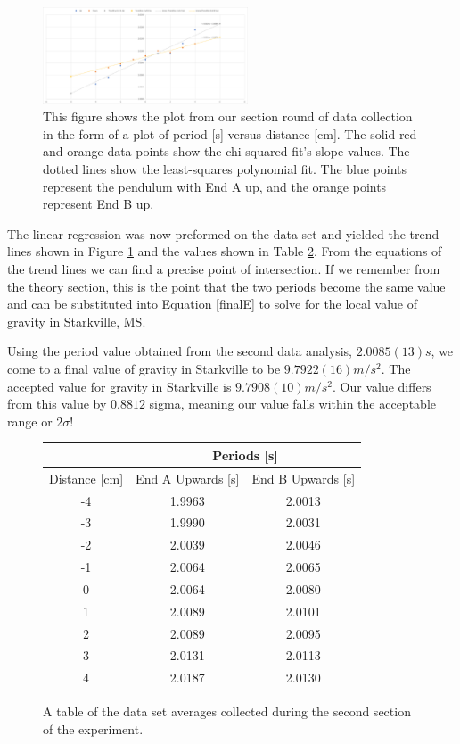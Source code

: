 \documentclass[aps,prl,10pt,twocolumn,floatfix]{revtex4-2}
\begin{document}
\begin{figure}
\includegraphics[width=230px]{SecondMeasurement.png}
\caption{This figure shows the plot from our section round of data collection in the form of a plot of period [s] versus distance [cm]. The solid red and orange data points show the chi-squared fit's slope values. The dotted lines show the least-squares polynomial fit. The blue points represent the pendulum with End A up, and the orange points represent End B up.}
\label{2stGraph}
\end{figure}

The linear regression was now preformed on the data set and yielded the trend lines shown in Figure \ref{2stGraph} and the values shown in Table \ref{2ndTable}.
From the equations of the trend lines we can find a precise point of intersection.
If we remember from the theory section, this is the point that the two periods become the same value and can be substituted into Equation \ref{finalE} to solve for the local value of gravity in Starkville, MS. 

Using the period value obtained from the second data analysis, $2.0085(13)s$, we come to a final value of gravity in Starkville to be $9.7922(16)m/s^2$. 
The accepted value for gravity in Starkville is $9.7908(10)m/s^2$.
Our value differs from this value by $0.8812$ sigma, meaning our value falls within the acceptable range or $2\sigma$! 

\begin{figure}
\begin{tabular}{|c|c|c|}
\hline
& \multicolumn{2}{|c|}{Periods [s]}\\
\hline
Distance [cm] & End A Upwards [s] & End B Upwards [s]\\
\hline
-4&	1.9963&	2.0013\\
-3&	1.9990&	2.0031\\
-2&	2.0039&	2.0046\\
-1&	2.0064&	2.0065\\
0&	2.0064&	2.0080\\
1&	2.0089&	2.0101\\
2&	2.0089&	2.0095\\
3&	2.0131&	2.0113\\
4&	2.0187&	2.0130\\
\hline
\end{tabular}
\caption{A table of the data set averages collected during the second section of the experiment.}
\label{2ndTable}
\end{figure}
\end{document}
